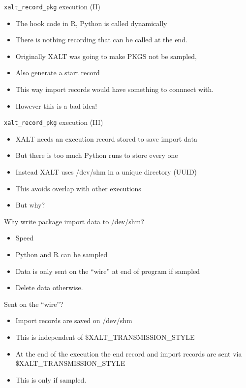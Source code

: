 \documentclass{beamer}
\begin{document}
\begin{frame}{\texttt{xalt\_record\_pkg} execution (II)}
  \begin{itemize}
    \item The hook code in R, Python is called dynamically
    \item There is nothing recording that can be called at the end.
    \item Originally XALT was going to make PKGS not be sampled,
    \item Also generate a start record
    \item This way import records would have something to connnect
      with.
    \item However this is a bad idea!
  \end{itemize}
\end{frame}

\begin{frame}{\texttt{xalt\_record\_pkg} execution (III)}
  \begin{itemize}
    \item XALT needs an execution record stored to save import data
    \item But there is too much Python runs to store every one
    \item Instead XALT uses /dev/shm in a unique directory (UUID)
    \item This avoids overlap with other executions
    \item But why?
  \end{itemize}
\end{frame}

\begin{frame}{Why write package import data to /dev/shm?}
  \begin{itemize}
    \item Speed
    \item Python and R can be sampled
    \item Data is only sent on the ``wire'' at end of program if sampled
    \item Delete data otherwise.
  \end{itemize}
\end{frame}

\begin{frame}{Sent on the ``wire''?}
  \begin{itemize}
    \item Import records are saved on /dev/shm
    \item This is independent of \$XALT\_TRANSMISSION\_STYLE
    \item At the end of the execution the end record and import
      records are sent via \$XALT\_TRANSMISSION\_STYLE
    \item This is only if sampled.
  \end{itemize}
\end{frame}
\end{document}
